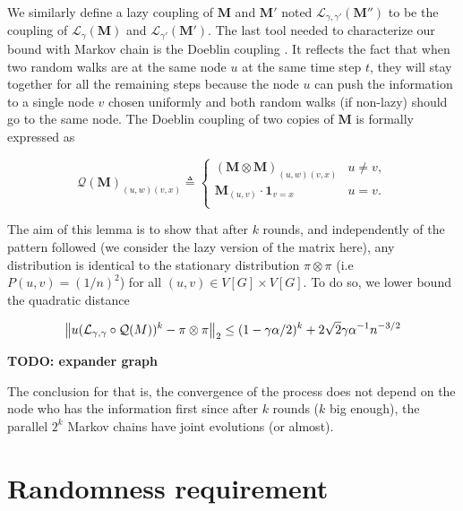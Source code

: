 \documentclass[10pt,journal,a4paper]{IEEEtran}
\begin{document}
We similarly define a lazy coupling of $\mathbf{M}$ and $\mathbf{M'}$ noted $\mathcal L_{\gamma, \gamma'}(\mathbf{M''})$ to be the coupling of $\mathcal L_\gamma(\mathbf{M})$ and $\mathcal L_{\gamma'}(\mathbf{M'})$. The last tool needed to characterize our bound with Markov chain is the Doeblin coupling \cite{coupling}. It reflects the fact that when two random walks are at the same node $u$ at the same time step $t$, they will stay together for all the remaining steps because the node $u$ can push the information to a single node $v$ chosen uniformly and both random walks (if non-lazy) should go to the same node. The Doeblin coupling of two copies of $\mathbf{M}$ is formally expressed as

\[
  \mathcal Q(\mathbf{M})_{(u,w)(v,x)} \triangleq \left\{
    \begin{array}{ll}
      (\mathbf{M} \otimes \mathbf{M})_{(u,w)(v,x)} & u \not = v,\\
      \mathbf{M}_{(u,v)} \cdot \mathbf{1}_{v = x} & u = v.\\
    \end{array}
  \right.
\]

The aim of this lemma is to show that after $k$ rounds, and independently of the pattern followed (we consider the lazy version of the matrix here), any distribution is identical to the stationary distribution $\pi \otimes \pi$ (i.e $P(u,v)=(1/n)^2$) for all $(u,v) \in V[G] \times V[G]$. To do so, we lower bound the quadratic distance

\[
  \left\lVert u(\mathcal L_{\gamma,\gamma} \circ \mathcal Q(M))^k - \pi \otimes \pi\right\rVert_2 \leq (1 - \gamma \alpha / 2)^k + 2 \sqrt 2 \gamma \alpha^{-1} n^{-3/2}
\]

\textbf{TODO: expander graph}

The conclusion for that is, the convergence of the process does not depend on the node who has the information first since after $k$ rounds ($k$ big enough), the parallel $2^k$ Markov chains have joint evolutions (or almost).



\section{Randomness requirement}
\end{document}
